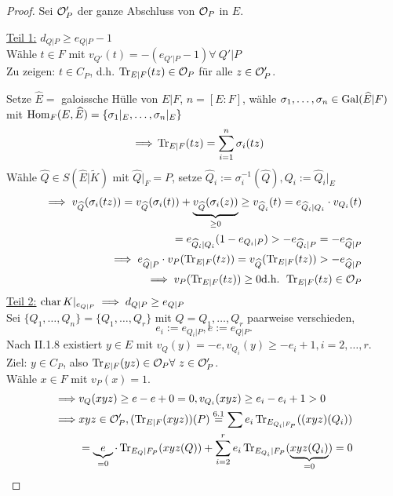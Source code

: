 \begin{proof}
    Sei $\mathcal{O}'_P$ der ganze Abschluss von $\mathcal{O}_P$ in $E$.

    \underline{Teil 1:} $d_{Q|P} \geq e_{Q|P} - 1$\\
    Wähle $t\in F$ mit $v_{Q'}(t) = -(e_{Q'|P}-1) \forall~Q'|P$\\
    Zu zeigen: $t \in C_P$, d.h. $\operatorname{Tr}_{E|F}(tz)\in \mathcal{O}_P$ für alle $z \in \mathcal{O}'_P$.

    \newcommand{\Eh}{\widehat{E}}
    \newcommand{\Qh}{\widehat{Q}}
    Setze $\Eh = $ galoissche Hülle von $E|F$, $n = [E:F]$, wähle $\sigma_1,\ldots,\sigma_n \in \Gal(\Eh|F)$ mit 
    $\Hom_F(E,\Eh)=\{\sigma_1|_E,\ldots,\sigma_n|_E\}$
    \begin{align*}
        \implies & \operatorname{Tr}_{E|F}(tz) = \sum_{i=1}^n \sigma_i(tz) 
    \end{align*}
    Wähle $\Qh \in S(\Eh|\tilde{K})$ mit $\Qh|_F = P$, setze $\Qh_i := \sigma_i^{-1}(\Qh), Q_i:= \Qh_i|_E$
    \begin{align*}
        \implies v_{\Qh}(\sigma_i(tz)) = v_{\Qh}(\sigma_i(t)) + \underbrace{v_{\Qh}(\sigma_i(z))}_{\geq 0} \geq
        v_{\Qh_i}(t) = e_{\Qh_i|Q_i}\cdot v_{Q_i}(t)\\
        = e_{\Qh_i|Q_i}(1-e_{Q_i|P}) > - e_{\Qh_i|P} = -e_{\Qh|P}\\
        \implies e_{\Qh|P} \cdot v_P(\Tr_{E|F}(tz)) = v_{\Qh}(\Tr_{E|F}(tz)) > - e_{\Qh|P}\\
        \implies v_P(\Tr_{E|F}(tz)) \geq 0 \text{d.h. } \Tr_{E|F}(tz) \in \O_P 
    \end{align*}
    \underline{Teil 2:} $\operatorname{char} K|_{e_{Q|P}} \implies d_{Q|P} \geq e_{Q|P}$\\
    Sei $\{Q_1,\ldots,Q_n\} = \{Q_1,\ldots,Q_r\}$ mit $Q = Q_1,\ldots,Q_r$ paarweise verschieden,
    $$ e_i := e_{Q_i|P}, e:= e_{Q|P}.$$
    Nach II.1.8 existiert $y \in E$ mit $v_Q(y) = -e, v_{Q_i}(y) \geq - e_i + 1, i=2,\ldots,r$.\\
    Ziel: $y \in C_P$, also $\operatorname{Tr}_{E|F}(yz) \in \mathcal{O}_P \forall~ z\in \mathcal{O}'_P$.\\
    Wähle $x \in F$ mit $v_P(x) = 1$.
    \begin{align*}
        \implies & v_Q(xyz) \geq e-e+0 = 0, v_{Q_i}(xyz) \geq e_i - e_i +1 > 0\\
        \implies & xyz \in \O'_P, (\Tr_{E|F}(xyz))(P) \stackeq{6.1} \sum e_i \Tr_{E_{Q_i|F_P}}((xyz)(Q_i))\\
        & = \underbrace{e}_{=0} \cdot \Tr_{E_Q|F_P}(xyz(Q)) + \sum_{i=2}^r e_i \Tr_{E_{Q_i}|F_P}(\underbrace{xyz(Q_i)}_{=0})=0\\

\end{align*}
\end{proof}
